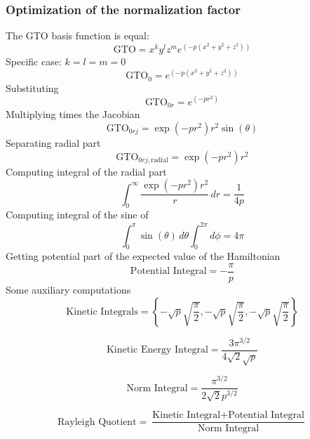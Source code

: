 \subsubsection{Optimization of the normalization factor}
The GTO basis function is equal:
\begin{equation}
	\text{GTO} = x^k y^l z^m e^{(-p(x^2 + y^2 + z^2))}
\end{equation}
Specific case: $k = l = m = 0$
\begin{equation}
	\text{GTO}_0 = e^{(-p(x^2 + y^2 + z^2))}
\end{equation}
Substituting
\begin{equation}
	\text{GTO}_{0r} = e^{(-pr^2)}
\end{equation}
Multiplying times the Jacobian
\begin{equation}
	\text{GTO}_{0rj} = \exp(-pr^2) r^2 \sin(\theta)
\end{equation}
Separating radial part
\begin{equation}
	\text{GTO}_{0rj,\text{radial}} = \exp(-pr^2) r^2
\end{equation}
Computing integral of the radial part
\begin{equation}
	\int_0^\infty \frac{\exp(-pr^2) r^2}{r} \, dr = \frac{1}{4p}
\end{equation}
Computing integral of the sine of \Theta
\begin{equation}
	\int_0^\pi \sin(\theta) \, d\theta \int_0^{2\pi} d\phi = 4\pi
\end{equation}
Getting potential part of the expected value of the Hamiltonian
\begin{equation}
	\text{Potential Integral} = - \frac{\pi}{p}
\end{equation}
Some auxiliary computations
\begin{equation}
	\text{Kinetic Integrals} = 
	\left\{
	-\sqrt{p} \sqrt{\frac{\pi}{2}}, 
	-\sqrt{p} \sqrt{\frac{\pi}{2}}, 
	-\sqrt{p} \sqrt{\frac{\pi}{2}}
	\right\}
\end{equation}

\begin{equation}
	\text{Kinetic Energy Integral} = 
	\frac{3 \pi^{3/2}}{4 \sqrt{2} \sqrt{p}}
\end{equation}

\begin{equation}
	\text{Norm Integral} = \frac{\pi^{3/2}}{2 \sqrt{2} p^{3/2}}
\end{equation}

\begin{equation}
	\text{Rayleigh Quotient} = \frac{\text{Kinetic Integral} + \text{Potential Integral}}{\text{Norm Integral}}
\end{equation}

